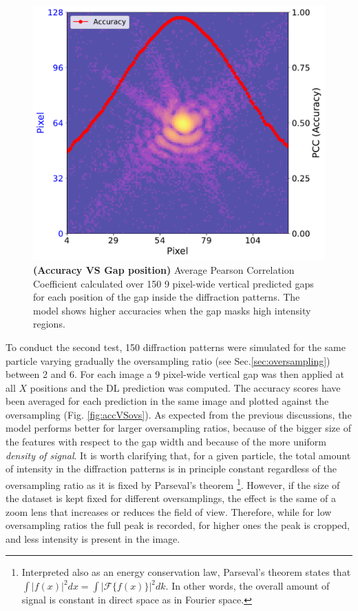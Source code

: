 \begin{figure}[h]
    \centering
    \includegraphics[width=.7\textwidth]{figures/Inpainting/2D_acc_pos.pdf}
    \caption{\textbf{(Accuracy VS Gap position)} Average Pearson Correlation Coefficient calculated over 150 
    9 pixel-wide vertical predicted gaps for each position of the gap inside the diffraction patterns. The model 
    shows higher accuracies when the gap masks high intensity regions.}
    \label{fig:accVSpos}
\end{figure}

To conduct the second test, 150 diffraction patterns were simulated for the same particle varying gradually the oversampling
ratio (see Sec.\ref{sec:oversampling}) between 2 and 6. For each image a 9 pixel-wide vertical gap was then applied 
at all $X$ positions and the DL prediction was computed. The accuracy scores have been averaged for each prediction 
in the same image and plotted against the oversampling 
(Fig. \ref{fig:accVSovs}). As expected from the previous discussions, the model performs better for larger oversampling ratios, 
because of the bigger size of the features with respect to the gap width and because of the more uniform \textit{density of signal}.
It is worth clarifying that, for a given particle, the total amount of intensity in the
diffraction patterns is in principle constant regardless of the oversampling ratio as it is fixed by Parseval's theorem
\footnote{Interpreted also as an energy conservation law, Parseval's theorem states that $ \int |f(x)|^2 dx = \int |\mathcal{F}\{f(x)\}|^2 dk$. 
In other words, the overall amount of signal is constant in direct space as in Fourier space.}.
However, if the size of the dataset is kept fixed for different oversamplings, the effect is the same of a zoom lens
that increases or reduces the field of view. Therefore, while for low oversampling ratios the full peak is recorded, 
for higher ones the peak is cropped, and less intensity is present in the image.

